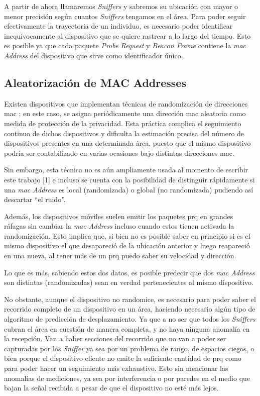 A partir de ahora llamaremos \emph{Sniffers} y sabremos su ubicación con mayor o menor precisión según cuantos \emph{Sniffers} tengamos en el área. Para poder seguir efectivamente la trayectoria de un individuo, es necesario poder identificar inequívocamente al dispositivo que se quiere rastrear a lo largo del tiempo. Esto es posible ya que cada paquete \emph{Probe Request} y \emph{Beacon Frame} contiene la \textit{\acs{mac} Address} del dispositivo que sirve como identificador único. 

\subsection{ Aleatorización de MAC Addresses}

Existen dispositivos que implementan técnicas de randomización de direcciones \acs{mac} \cite{martin2017study}; en este caso, se asigna periódicamente una dirección \acs{mac} aleatoria como medida de protección de la privacidad. Esta práctica complica el seguimiento continuo de dichos dispositivos y dificulta la estimación precisa del número de dispositivos presentes en una determinada área, puesto que el mismo dispositivo podría ser contabilizado en varias ocasiones bajo distintas direcciones \acs{mac}.

 Sin embargo, esta técnica no es aún ampliamente usada al momento de escribir este trabajo [1] e incluso se cuenta con la posibilidad de distinguir rápidamente si una \textit{\acs{mac} Address} es local (randomizada) o global (no randomizada) pudiendo así descartar “el ruido”.

Además, los dispositivos móviles \cite{freudiger2015talkative} suelen emitir los paquetes \acl{prq} en grandes ráfagas sin cambiar la \textit{\acs{mac} Address} incluso cuando estos tienen activada la randomización. Esto implica que, si bien no es posible saber en principio si es el mismo dispositivo el que desapareció de la ubicación anterior y luego reapareció en una nueva, al tener más de un \acl{prq} puedo saber su velocidad y dirección.

Lo que es más, sabiendo estos dos datos, es posible predecir que dos \textit{\acs{mac} Address} son distintas (randomizadas) sean en verdad pertenecientes al mismo dispositivo.

No obstante, aunque el dispositivo no randomice, es necesario para poder saber el recorrido completo de un dispositivo en un área, haciendo necesario algún tipo de algoritmo de predicción de desplazamiento. Ya que a no ser que todos los \emph{Sniffer}\textit{s} cubran el área en cuestión de manera completa, y no haya ninguna anomalía en la recepción. Van a haber secciones del recorrido que no van a poder ser capturadas por los \emph{Sniffer} ya sea por un problema de rango, de espacios ciegos, o bien porque el dispositivo cliente no emite la suficiente cantidad de \acl{prq} como para poder hacer un seguimiento más exhaustivo. Esto sin mencionar las anomalías de mediciones, ya sea por interferencia o por paredes en el medio que bajan la señal recibida a pesar de que el dispositivo no esté más lejos. 

